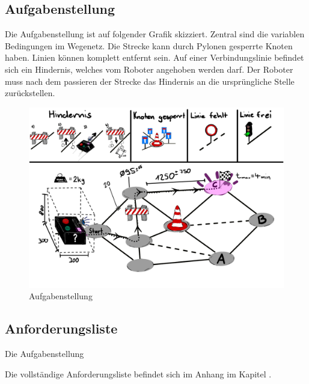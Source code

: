 \subsection{Aufgabenstellung}

Die Aufgabenstellung ist auf folgender Grafik skizziert. Zentral sind die variablen Bedingungen im Wegenetz. Die Strecke kann durch Pylonen gesperrte Knoten haben. Linien können komplett entfernt sein.  Auf einer Verbindungslinie befindet sich ein Hindernis, welches vom Roboter angehoben werden darf. Der Roboter muss nach dem passieren der Strecke das Hindernis an die ursprüngliche Stelle zurückstellen.  

\begin{figure}[H]
\centering
\includegraphics[width=\textwidth]{img/Skizze_Aufgabenstellung_v4.2.png}
\caption{Aufgabenstellung}
\label{fig:aufgebanstellung}
\end{figure}

\subsection{Anforderungsliste}

Die Aufgabenstellung

Die vollständige Anforderungsliste befindet sich im Anhang im Kapitel .